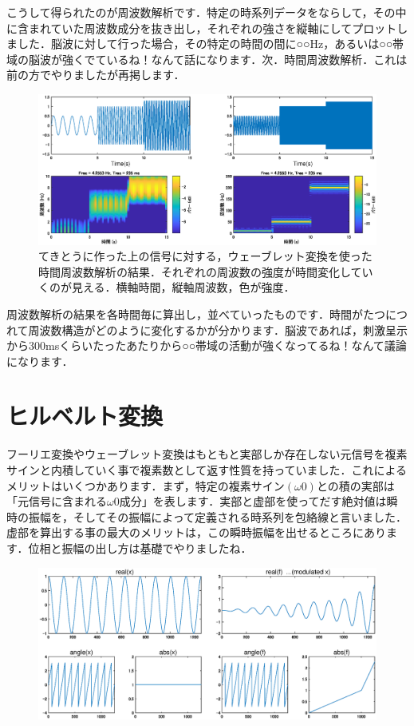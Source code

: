 \documentclass[11pt,a4paper]{ujreport} 	%
\begin{document}
こうして得られたのが周波数解析です．特定の時系列データをならして，その中に含まれていた周波数成分を抜き出し，それぞれの強さを縦軸にしてプロットしました．脳波に対して行った場合，その特定の時間の間に○○Hz，あるいは○○帯域の脳波が強くでているね！なんて話になります．次．時間周波数解析．これは前の方でやりましたが再掲します．

\begin{figure}[H]
  \centering
  \includegraphics[width=15cm]{../figures/tft2.eps}
  \caption{てきとうに作った上の信号に対する，ウェーブレット変換を使った時間周波数解析の結果．それぞれの周波数の強度が時間変化していくのが見える．横軸時間，縦軸周波数，色が強度．}
\end{figure}

周波数解析の結果を各時間毎に算出し，並べていったものです．時間がたつにつれて周波数構造がどのように変化するかが分かります．脳波であれば，刺激呈示から300msくらいたったあたりから○○帯域の活動が強くなってるね！なんて議論になります．

\section{ヒルベルト変換}
フーリエ変換やウェーブレット変換はもともと実部しか存在しない元信号を複素サインと内積していく事で複素数として返す性質を持っていました．これによるメリットはいくつかあります．まず，特定の複素サイン$(\omega 0)$との積の実部は「元信号に含まれる$\omega 0$成分」を表します．実部と虚部を使ってだす絶対値は瞬時の振幅を，そしてその振幅によって定義される時系列を包絡線と言いました．\\

虚部を算出する事の最大のメリットは，この瞬時振幅を出せるところにあります．位相と振幅の出し方は基礎でやりましたね．

\begin{figure}[H]
  \centering
  \includegraphics[width=12cm]{../figures/abs-angle.eps}
\end{figure}
\end{document}
